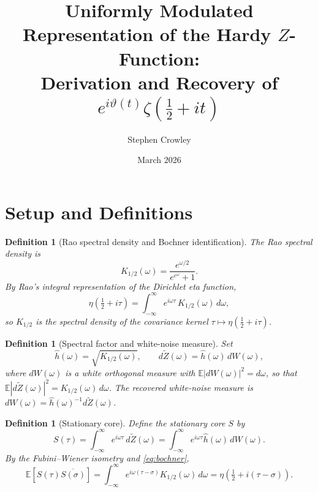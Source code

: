 \documentclass[11pt,a4paper]{article}
\title{Uniformly Modulated Representation of the Hardy $Z$-Function:\\
Derivation and Recovery of $e^{i\vartheta(t)}\zeta(\tfrac{1}{2}+it)$}
\author{Stephen Crowley}
\date{March 2026}
\newtheorem{definition}[theorem]{Definition}
\begin{document}
\maketitle

\section{Setup and Definitions}

\begin{definition}[Rao spectral density and Bochner identification]
\label{def:rao}
The \emph{Rao spectral density} is
\begin{equation}
  K_{1/2}(\omega)=\frac{e^{\omega/2}}{e^{e^\omega}+1}.
\end{equation}
By Rao's integral representation of the Dirichlet eta function,
\begin{equation}
  \label{eq:bochner}
  \eta\!\left(\tfrac{1}{2}+i\tau\right)
  =\int_{-\infty}^{\infty} e^{i\omega\tau}\,K_{1/2}(\omega)\,d\omega,
\end{equation}
so $K_{1/2}$ is the spectral density of the covariance kernel
$\tau\mapsto\eta(\tfrac{1}{2}+i\tau)$.
\end{definition}

\begin{definition}[Spectral factor and white-noise measure]
\label{def:spectral-factor}
Set
\begin{equation}
  \hat{h}(\omega)=\sqrt{K_{1/2}(\omega)},
  \qquad
  d\widetilde{Z}(\omega)=\hat{h}(\omega)\,dW(\omega),
\end{equation}
where $dW(\omega)$ is a white orthogonal measure with
$\mathbb{E}|dW(\omega)|^2=d\omega$, so that
$\mathbb{E}|d\widetilde{Z}(\omega)|^2=K_{1/2}(\omega)\,d\omega$.
The \emph{recovered white-noise measure} is
$dW(\omega)=\hat{h}(\omega)^{-1}d\widetilde{Z}(\omega)$.
\end{definition}

\begin{definition}[Stationary core]
\label{def:stationary-core}
Define the \emph{stationary core} $S$ by
\begin{equation}
  \label{eq:S-def}
  S(\tau)=\int_{-\infty}^{\infty} e^{i\omega\tau}\,d\widetilde{Z}(\omega)
  =\int_{-\infty}^{\infty} e^{i\omega\tau}\hat{h}(\omega)\,dW(\omega).
\end{equation}
By the Fubini--Wiener isometry and \eqref{eq:bochner},
\begin{equation}
  \label{eq:S-covariance}
  \mathbb{E}[S(\tau)\overline{S(\sigma)}]
  =\int_{-\infty}^{\infty} e^{i\omega(\tau-\sigma)}K_{1/2}(\omega)\,d\omega
  =\eta\!\left(\tfrac{1}{2}+i(\tau-\sigma)\right).
\end{equation}
\end{definition}
\end{document}
